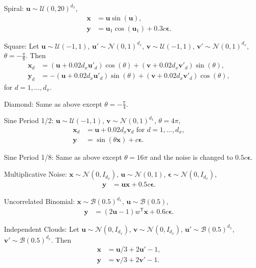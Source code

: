 \documentclass[11pt]{article}
\newcommand{\T}{^{\ensuremath{\mathsf{T}}}}           %
\providecommand{\mb}[1]{\boldsymbol{#1}}
\providecommand{\mc}[1]{\mathcal{#1}}
\begin{document}
\begin{compactenum}
\item Spiral: $\mb{u} \sim \mc{U}(0,20)^{d_{x}}$,
\begin{align*}
\mb{x}&=\mb{u}\sin(\mb{u}),\\
\mb{y}&=\mb{u}_{1}\cos(\mb{u}_{1})+0.3c\mb{\epsilon}.
\end{align*}
\item Square: Let $\mb{u} \sim \mc{U}(-1,1)$, $\mb{u}' \sim \mc{N}(0,1)^{d_{x}}$, $\mb{v} \sim \mc{U}(-1,1)$, $\mb{v}' \sim \mc{N}(0,1)^{d_{x}}$, $\theta=-\frac{\pi}{8}$. Then
\begin{align*}
\mb{x}_{d}&=(\mb{u}+0.02 d_{x}\mb{u}'_{d}) \cos(\theta) + (\mb{v}+0.02 d_{x}\mb{v}'_{d}) \sin(\theta),\\
\mb{y}_{d}&=-(\mb{u}+0.02 d_{x}\mb{u}'_{d}) \sin(\theta) + (\mb{v}+0.02 d_{x}\mb{v}'_{d}) \cos(\theta),
\end{align*}
for $d=1,\ldots,d_{x}$.
\item Diamond: Same as above except $\theta=-\frac{\pi}{4}$.
\item Sine Period 1/2: $\mb{u} \sim \mc{U}(-1,1)$, $\mb{v} \sim \mc{N}(0,1)^{d_{x}}$, $\theta=4\pi$,
\begin{align*}
\mb{x}_{d}&=\mb{u}+0.02 d_{x} \mb{v}_{d} \mbox{ for $d=1,\ldots,d_{x}$}, \\
\mb{y}&=\sin ( \theta \mb{x} )+c\mb{\epsilon}.
\end{align*}
\item Sine Period 1/8: Same as above except $\theta=16\pi$ and the noise is changed to $0.5c\mb{\epsilon}$.
\item Multiplicative Noise: $\mb{x} \sim \mc{N}(0, I_{d_{x}})$, $\mb{u} \sim \mc{N}(0, 1)$, $\mb{\epsilon} \sim \mc{N}(0, I_{d_{x}})$,
\begin{align*}
\mb{y}&=\mb{u}\mb{x}+0.5c\mb{\epsilon}.
\end{align*}
\item Uncorrelated Binomial: $\mb{x} \sim \mc{B}(0.5)^{d_{x}}$, $\mb{u} \sim \mc{B}(0.5)$,
\begin{align*}
\mb{y}&=(2\mb{u}-1)w\T \mb{x}+0.6c\mb{\epsilon}.
\end{align*}
\item Independent Clouds: Let $\mb{u} \sim \mc{N}(0,I_{d_{x}})$, $\mb{v} \sim \mc{N}(0,I_{d_{x}})$, $\mb{u}' \sim \mc{B}(0.5)^{d_{x}}$, $\mb{v}' \sim \mc{B}(0.5)^{d_{x}}$. Then
\begin{align*}
\mb{x}&=\mb{u}/3+2\mb{u}'-1,\\
\mb{y}&=\mb{v}/3+2\mb{v}'-1.
\end{align*}
\end{compactenum}
\end{document}
